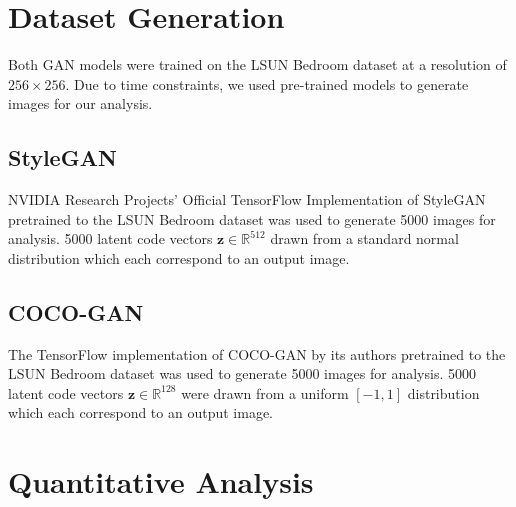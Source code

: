 \documentclass[12pt]{article}
\begin{document}
\begin{multicols*}{2}
        \section{Dataset Generation}
        \label{sec:dataset}
        Both GAN models were trained on the LSUN Bedroom dataset\cite{lsunBedroom} at a resolution of $256 \times 256$.
        Due to time constraints, we used pre-trained models to generate images for our analysis.

        \label{sec:datasetGeneration}
        \subsection{StyleGAN}
        \label{subsec:styleganGeneration}
        NVIDIA Research Projects' Official TensorFlow Implementation of StyleGAN pretrained to the LSUN Bedroom dataset\cite{styleGANCode} was used to generate 5000 images for analysis.
        5000 latent code vectors $\mathbf{z} \in \mathbb{R}^{512}$ drawn from a standard normal distribution which each correspond to an output image.

        \subsection{COCO-GAN}
        \label{subsec:cocoganGeneration}
        The TensorFlow implementation of COCO-GAN by its authors pretrained to the LSUN Bedroom dataset\cite{cocogan} was used to generate 5000 images for analysis.
        5000 latent code vectors $\mathbf{z} \in \mathbb{R}^{128}$ were drawn from a uniform $[-1, 1]$ distribution which each correspond to an output image.

        \section{Quantitative Analysis}
        \label{sec:quantitative}

\end{multicols*}
\end{document}
